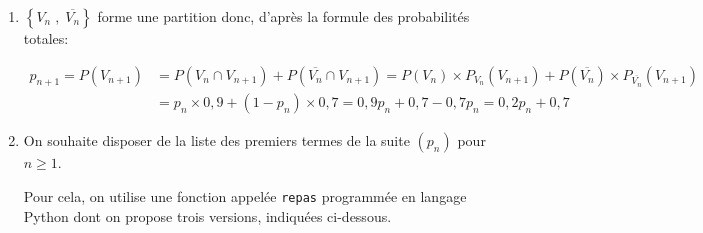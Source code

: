 \begin{enumerate}
\item
$\left \{ V_n\;,\; \overline{V_n} \right \}$ forme une partition donc, d'après la formule des probabilités totales:

$\begin{aligned}
p_{n+1}=P\left(V_{n+1}\right)
&  = P\left(V_n \cap V_{n+1}\right) +P\left (\overline{V_n} \cap V_{n+1}\right)
= P\left(V_n\right) \times P_{V_n}\left(V_{n+1}\right) + P\left(\overline{ V_n} \right) \times P_{\overline{V_n}}\left(V_{n+1}\right)\\
& = p_n\times 0,9+ \left (1-p_n\right )\times 0,7
= 0,9p_n + 0,7 - 0,7p_n = 0,2p_n + 0,7
\end{aligned}$

\item On souhaite disposer de la liste des premiers termes de la suite $(p_n)$ pour $n \geqslant 1$.

Pour cela, on utilise une fonction appelée \texttt{repas} programmée en langage Python dont on propose trois versions, indiquées ci-dessous.


\begin{center}
{\scriptsize
{}
}
\end{center}


\end{enumerate}
